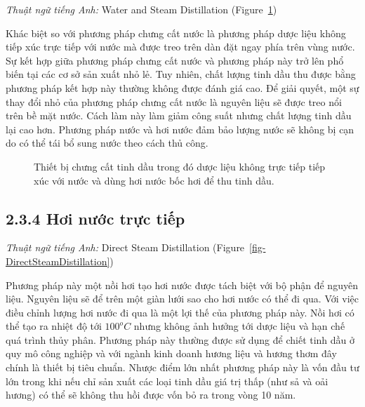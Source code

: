 \documentclass[
  twocolumn,
  landscape]{report}
\begin{document}
\emph{Thuật ngữ tiếng Anh:} Water and Steam Distillation
(Figure~\ref{fig-WaterSteamDistillation})

Khác biệt so với phương pháp chưng cất nước là phương pháp dược liệu
không tiếp xúc trực tiếp với nước mà được treo trên dàn đặt ngay phía
trên vùng nước. Sự kết hợp giữa phương pháp chưng cất nước và phương
pháp này trở lên phổ biến tại các cơ sở sản xuất nhỏ lẻ. Tuy nhiên, chất
lượng tinh dầu thu được bằng phương pháp kết hợp này thường không được
đánh giá cao. Để giải quyết, một sự thay đổi nhỏ của phương pháp chưng
cất nước là nguyên liệu sẽ được treo nổi trên bề mặt nước. Cách làm này
làm giảm công suất nhưng chất lượng tinh dầu lại cao hơn. Phương pháp
nước và hơi nước đảm bảo lượng nước sẽ không bị cạn do có thể tái bổ
sung nước theo cách thủ công.

\begin{figure}


\caption{\label{fig-WaterSteamDistillation}Thiết bị chưng cất tinh dầu
trong đó dược liệu không trực tiếp tiếp xúc với nước và dùng hơi nước
bốc hơi để thu tinh dầu.}

\end{figure}%

\subsection{2.3.4 Hơi nước trực
tiếp}\label{hux1a1i-nux1b0ux1edbc-trux1ef1c-tiux1ebfp}

\emph{Thuật ngữ tiếng Anh:} Direct Steam Distillation
(Figure~\ref{fig-DirectSteamDistillation})

Phương pháp này một nồi hơi tạo hơi nước được tách biệt với bộ phận để
nguyên liệu. Nguyên liệu sẽ để trên một giàn lưới sao cho hơi nước có
thể đi qua. Với việc điều chỉnh lượng hơi nước đi qua là một lợi thế của
phương pháp này. Nồi hơi có thể tạo ra nhiệt độ tới \(100^oC\) nhưng
không ảnh hưởng tới dược liệu và hạn chế quá trình thủy phân. Phương
pháp này thường được sử dụng để chiết tinh dầu ở quy mô công nghiệp và
với ngành kinh doanh hương liệu và hương thơm đây chính là thiết bị tiêu
chuẩn. Nhược điểm lớn nhất phương pháp này là vốn đầu tư lớn trong khi
nếu chỉ sản xuất các loại tinh dầu giá trị thấp (như sả và oải hương) có
thể sẽ không thu hồi được vốn bỏ ra trong vòng 10 năm.
\end{document}
